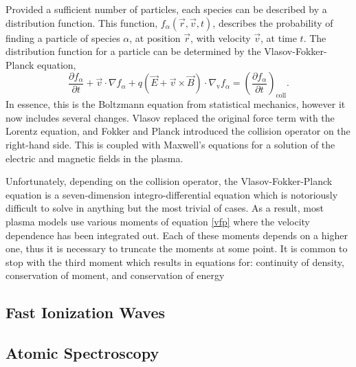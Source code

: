 
Provided a sufficient number of particles, each species can be described by a
distribution function. This function, $f_\alpha(\vec{r}, \vec{v}, t)$, describes
the probability of finding a particle of species $\alpha$, at position
$\vec{r}$, with velocity $\vec{v}$, at time $t$. The distribution function for a
particle can be determined by the Vlasov-Fokker-Planck equation,
\begin{equation}\label{eq:vfp}
  \frac{\partial f_\alpha}{\partial t} + \vec{v}\cdot\nabla f_\alpha +
  q \left(\vec{E} + \vec{v}\times\vec{B}\right) \cdot \nabla_\mathrm{v} f_\alpha =
  \left( \frac{\partial f_\alpha}{\partial t}\right)_\mathrm{coll}.
\end{equation}
In essence, this is the Boltzmann equation from statistical mechanics, however
it now includes several changes. Vlasov replaced the original force term with
the Lorentz equation, and Fokker and Planck introduced the collision operator on
the right-hand side. This is coupled with Maxwell's equations for a solution of
the electric and magnetic fields in the plasma.

Unfortunately, depending on the collision operator, the Vlasov-Fokker-Planck
equation is a seven-dimension integro-differential equation which is notoriously
difficult to solve in anything but the most trivial of cases. As a result, most
plasma models use various moments of equation \ref{vfp} where the velocity
dependence has been integrated out. Each of these moments depends on a higher
one, thus it is necessary to truncate the moments at some point. It is common to
stop with the third moment which results in equations for: continuity of
density, conservation of moment, and conservation of energy

\subsection{Fast Ionization Waves}

\subsection{Atomic Spectroscopy}


